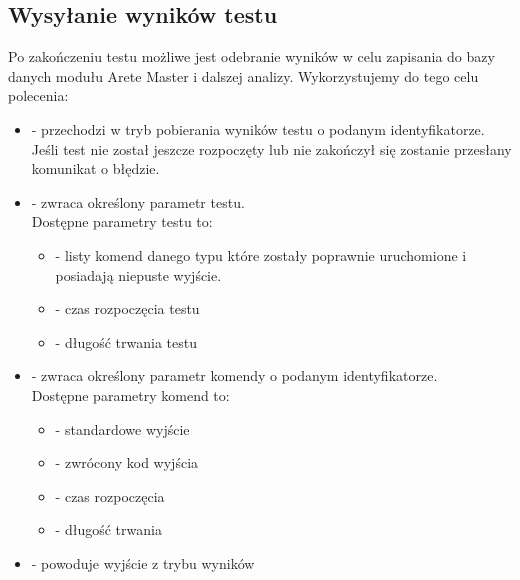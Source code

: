 \documentclass[00-praca-magisterska.tex]{subfiles}
\begin{document}
\subsection{Wysyłanie wyników testu}
\label{arete-slave-wysylanie-wynikow-testu}

Po zakończeniu testu możliwe jest odebranie wyników w celu zapisania do
bazy danych modułu Arete Master i dalszej analizy. Wykorzystujemy do tego celu
polecenia:

\begin{itemize}
  \setlength{\itemsep}{10pt}

\item{ - przechodzi w tryb pobierania
wyników testu o podanym identyfikatorze. Jeśli test nie został jeszcze
rozpoczęty lub nie zakończył się zostanie przesłany komunikat o błędzie.}

\item{ - zwraca określony parametr testu. \\

Dostępne parametry testu to: \\

\begin{itemize}
  \setlength{\itemsep}{10pt}

\item{ - listy komend danego typu które
zostały poprawnie uruchomione i posiadają niepuste wyjście.}

\item{ - czas rozpoczęcia testu}

\item{ - długość trwania testu}

\end{itemize}}

\item{ - zwraca określony parametr
komendy o podanym identyfikatorze. \\

Dostępne parametry komend to: \\

\begin{itemize}
  \setlength{\itemsep}{10pt}

\item{ - standardowe wyjście}

\item{ - zwrócony kod wyjścia}

\item{ - czas rozpoczęcia}

\item{ - długość trwania}

\end{itemize}}

\item{ - powoduje wyjście z trybu wyników}

\end{itemize}
\end{document}
